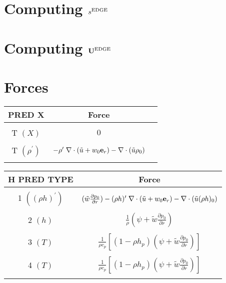 \documentclass[11pt]{article}
\def\edge  {\rm EDGE}
\def\Ub    {{\bf U}}
\def\er    {{\bf e}_r}
\def\ut    {\tilde{u}}
\begin{document}
\section{Computing $s^{\edge}$}


\section{Computing $\Ub^{\edge}$}


\section{Forces}

\cleardoublepage
\begin{table*}
\begin{center}
\caption{Forcing term into make edge scal \newline}
\begin{tabular}{|c|c|c|}
\multicolumn{1}{c}{PRED X}   & \multicolumn{1}{c}{Force} \\
\hline
  &   \\
T $(X)$ & $0$ \\
  &   \\
T $(\rho^\prime)$ & $-\rho^\prime \; \nabla \cdot (\ut+w_0 \er) - \nabla \cdot (\ut \rho_0) $  \\
  &   \\
\hline
\end{tabular}
\end{center}
\begin{center}
\begin{tabular}{|c|c|}
\multicolumn{1}{c}{H PRED TYPE}   & \multicolumn{1}{c}{Force} \\
\hline
   & \\
 1 $((\rho h)^\prime)$ &  $(\tilde{w} \frac{\partial p_0}{\partial r}) - (\rho h)^\prime \; \nabla \cdot (\ut+w_0 \er) - \nabla \cdot (\ut (\rho h)_0) $  \\
   & \\
 2 $(h)$ & $\frac{1}{\rho} (\psi + \tilde{w} \frac{\partial p_0}{\partial r})$  \\
   & \\
 3 $(T)$ & $\frac{1}{\rho c_p} \left[ (1 - \rho h_p) (\psi + \tilde{w} \frac{\partial p_0}{\partial r}) \right]$ \\
   & \\
 4 $(T)$ & $\frac{1}{\rho c_p} \left[ (1 - \rho h_p) (\psi + \tilde{w} \frac{\partial p_0}{\partial r}) \right]$ \\
   & \\
\hline
\hline
\end{tabular}
\end{center}
\end{table*}
\end{document}
